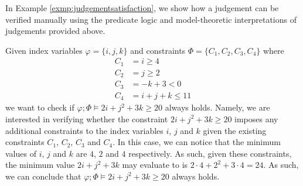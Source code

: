 In Example \ref{exmp:judgementsatisfaction}, we show how a judgement can be verified manually using the predicate logic and model-theoretic interpretations of judgements provided above.
%
\begin{example}\label{exmp:judgementsatisfaction}
    Given index variables $\varphi = \{i, j, k\}$ and constraints $\Phi = \{C_1, C_2, C_3, C_4\}$ where
    \begin{align*}
        C_1 &= i \geq 4\\
        C_2 &= j \geq 2\\
        C_3 &= -k + 3 < 0\\ %
        C_4 &= i + j + k \leq 11
    \end{align*}
    we want to check if $\varphi; \Phi \vDash 2i + j^2 + 3k \geq 20$ always holds. %
    Namely, we are interested in verifying whether the constraint $2i + j^2 + 3k \geq 20$ imposes any additional constraints to the index variables $i$, $j$ and $k$ given the existing constraints $C_1$, $C_2$, $C_3$ and $C_4$. In this case, we can notice that the minimum values of $i$, $j$ and $k$ are $4$, $2$ and $4$ respectively. As such, given these constraints, the minimum value $2i + j^2 + 3k$ may evaluate to is $2 \cdot 4 + 2^2 + 3 \cdot 4 = 24$. As such, we can conclude that $\varphi; \Phi \vDash 2i + j^2 + 3k \geq 20$ always holds.\\
    

\end{example}
